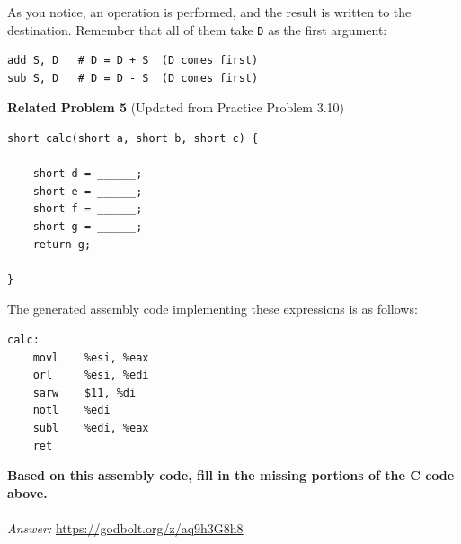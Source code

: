 \documentclass{article}
\begin{document}
As you notice, an operation is performed, and the result is written to the destination. Remember that all of them take \texttt{D} as the first argument:

\begin{verbatim}
add S, D   # D = D + S  (D comes first)
sub S, D   # D = D - S  (D comes first)
\end{verbatim}

\noindent
\textbf{Related Problem 5} (Updated from Practice Problem 3.10)

\begin{lstlisting}
short calc(short a, short b, short c) {

    short d = ______;
    short e = ______;
    short f = ______;
    short g = ______;
    return g;
    
}
\end{lstlisting}

The generated assembly code implementing these expressions is as follows:

\begin{lstlisting}
calc:
    movl    %esi, %eax
    orl     %esi, %edi
    sarw    $11, %di
    notl    %edi
    subl    %edi, %eax
    ret
\end{lstlisting}

\noindent
\textbf{Based on this assembly code, fill in the missing portions of the C code above.} \\
\\
\textit{Answer: }\url{https://godbolt.org/z/aq9h3G8h8}
\end{document}
